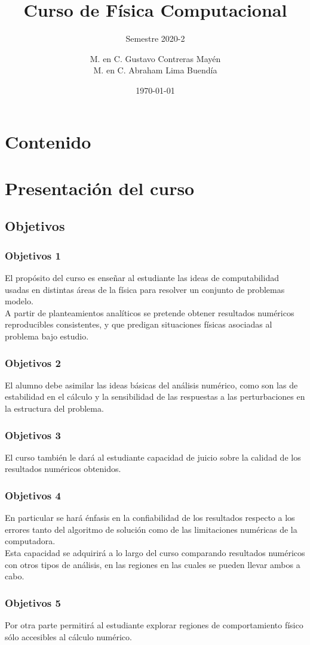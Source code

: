 \documentclass[12pt]{beamer}
\title{Curso de Física Computacional}
\subtitle{Semestre 2020-2}
\author[]{M. en C. Gustavo Contreras Mayén \\ M. en C. Abraham Lima Buendía}
\institute{Facultad de Ciencias - UNAM}
\date{\today}
\begin{document}
\maketitle
\section*{Contenido}
\fontsize{14}{14}\selectfont
\section{Presentación del curso}
\subsection{Objetivos}
\begin{frame}
\frametitle{Objetivos 1}
El propósito del curso es enseñar al estudiante las ideas de computabilidad usadas en distintas áreas de la  física para resolver un conjunto de problemas modelo. 
\\
\bigskip
\pause
A partir de planteamientos analíticos se pretende obtener resultados numéricos reproducibles consistentes, y que predigan situaciones físicas asociadas al problema bajo estudio.
\end{frame}
\begin{frame}
\frametitle{Objetivos 2}
El alumno debe asimilar las ideas básicas del análisis numérico, como son las de estabilidad en el cálculo y la sensibilidad de las respuestas a las perturbaciones en la estructura del problema.
\end{frame}
\begin{frame}
\frametitle{Objetivos 3}
El curso también le dará al estudiante capacidad de juicio sobre la calidad de los resultados numéricos obtenidos.
\end{frame}
\begin{frame}
\frametitle{Objetivos 4}
En particular se hará énfasis en la confiabilidad de los resultados respecto a los errores tanto del algoritmo de solución como de las limitaciones numéricas de la computadora. 
\\
\bigskip
\pause
Esta capacidad se adquirirá a lo largo del curso comparando resultados numéricos con otros tipos de análisis, en las regiones en las cuales se pueden llevar ambos a cabo.
\end{frame}
\begin{frame}
\frametitle{Objetivos 5}
 Por otra parte permitirá al estudiante explorar regiones de comportamiento físico sólo accesibles al cálculo numérico.
\end{frame}
\end{document}
